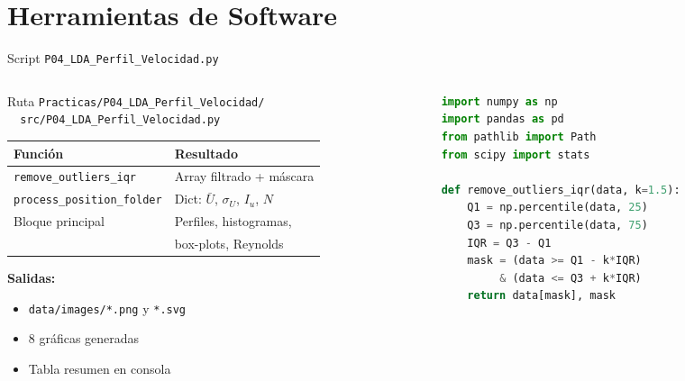 \documentclass[aspectratio=169,12pt]{beamer}
\begin{document}
\section{Herramientas de Software}

\begin{frame}[fragile]{Script \texttt{P04\_LDA\_Perfil\_Velocidad.py}}
	\begin{columns}
		\begin{column}{0.5\textwidth}
			\begin{block}{Ruta}
				\scriptsize
				\texttt{Practicas/P04\_LDA\_Perfil\_Velocidad/}\\
				\texttt{\ \ src/P04\_LDA\_Perfil\_Velocidad.py}
			\end{block}
			\vspace{0.2em}
			\scriptsize
			\begin{tabular}{ll}
				\toprule
				\textbf{Función}
				 & \textbf{Resultado}                      \\
				\midrule
				\texttt{remove\_outliers\_iqr}
				 & Array filtrado + máscara                \\
				\texttt{process\_position\_folder}
				 & Dict: $\bar{U}$, $\sigma_U$, $I_u$, $N$ \\
				Bloque principal
				 & Perfiles, histogramas,                  \\
				 & box-plots, Reynolds                     \\
				\bottomrule
			\end{tabular}
			\vspace{0.3em}

			\textbf{Salidas:}
			\begin{itemize}\scriptsize
				\item \texttt{data/images/*.png} y \texttt{*.svg}
				\item 8 gráficas generadas
				\item Tabla resumen en consola
			\end{itemize}
		\end{column}
		\begin{column}{0.47\textwidth}
			\begin{lstlisting}[language=Python]
import numpy as np
import pandas as pd
from pathlib import Path
from scipy import stats

def remove_outliers_iqr(data, k=1.5):
    Q1 = np.percentile(data, 25)
    Q3 = np.percentile(data, 75)
    IQR = Q3 - Q1
    mask = (data >= Q1 - k*IQR)
         & (data <= Q3 + k*IQR)
    return data[mask], mask


\end{lstlisting}
\end{column}
\end{columns}
\end{frame}
\end{document}
